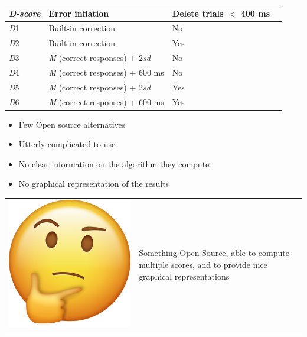 \documentclass[compress]{beamer}
\newcommand\Factor{1.2}
\begin{document}
\begin{frame}
	\begin{table}[th!]
		\centering
		\begin{tabular}{llll}
			\hline
			\emph{D-score} & Error inflation & Delete trials $<$ 400 ms\\\hline
			\emph{D}1 & Built-in correction & No \\
			\emph{D}2 & Built-in correction & Yes \\
			\emph{D}3 & \emph{M} (correct responses) + 2\emph{sd} & No\\
			\emph{D}4 & \emph{M} (correct responses) + 600 ms & No \\
			\emph{D}5 & \emph{M} (correct responses) + 2\emph{sd} & Yes\\
			\emph{D}6 & \emph{M} (correct responses) + 600 ms & Yes \\\hline
		\end{tabular}
	
	\end{table}
	\begin{itemize}
		\item[\large{\Sadey}] Few Open source alternatives
		\item[\large{\Sadey}] Utterly complicated to use
		\item[\large{\Sadey}] No clear information on the algorithm they compute
		\item[\large{\Sadey}] No graphical representation of the results
	\end{itemize}
	
	\vspace{3mm}
	\pause
	\begin{tabular}{l p{9cm}}
		{\includegraphics[height=5ex]{emoji.png}} & Something Open Source, able to compute multiple scores, and to provide nice graphical representations\\
	\end{tabular}

\end{frame}
\end{document}
